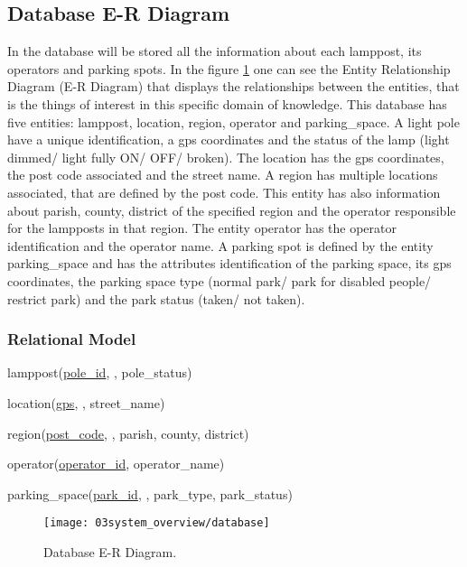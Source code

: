 \subsection{Database E-R Diagram}
In the database will be stored all the information about each lamppost, its operators and parking spots. In the figure \ref{fig:Database} one can see the Entity Relationship Diagram (E-R Diagram) that displays the relationships between the entities, that is the things of interest in this specific domain of knowledge. This database has five entities: lamppost, location, region, operator and parking\_space. A light pole have a unique identification, a \ac{gps} coordinates and the status of the lamp (light dimmed/ light fully ON/ OFF/ broken). The location has the \ac{gps} coordinates, the post code associated and the street name. A region has multiple locations associated, that are defined by the post code. This entity has also information about parish, county, district of the specified region and the operator responsible for the lampposts in that region. The entity operator has the operator identification and the operator name. A parking spot is defined by the entity parking\_space and has the attributes identification of the parking space, its \ac{gps} coordinates, the parking space type (normal park/ park for disabled people/ restrict park) and the park status (taken/ not taken).

\subsubsection{Relational Model}

lamppost(\uline{pole\_id}, , pole\_status)

location(\uline{gps}, , street\_name)

region(\uline{post\_code}, , parish, county, district)

operator(\uline{operator\_id}, operator\_name)

parking\_space(\uline{park\_id}, , park\_type, park\_status)

\begin{figure}[ht]
        \centering
        \texttt{[image: 03system\_overview/database]}
        \caption{Database E-R Diagram.}
        \label{fig:Database}
\end{figure}

